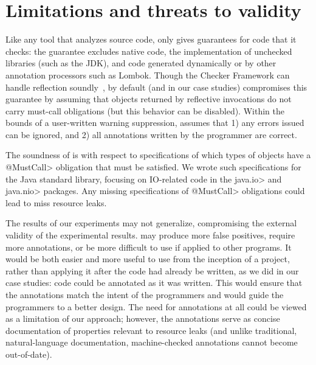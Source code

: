 \section{Limitations and threats to validity}
\label{sec:threats}

Like any tool that analyzes source code, \tool only
gives guarantees for code that it checks: the guarantee
excludes native code, the implementation of unchecked libraries (such as the JDK),
and code generated dynamically or by other annotation processors
such as Lombok.
Though
the Checker Framework can handle 
reflection soundly~\cite{BarrosJMVDdAE2015}, by default (and in our case studies)
\tool compromises this guarantee
by assuming that objects returned by reflective invocations
do not carry must-call obligations (but this behavior can
be disabled).
Within the bounds
of a user-written warning suppression, \tool assumes that 1)
any errors issued can be ignored, and 2) all annotations
written by the programmer are correct.

 The soundness of
\tool is with respect to specifications of which types of objects have a
\<@MustCall> obligation that must be satisfied.  We wrote such specifications
for the Java standard library, focusing on IO-related code in the \<java.io> and
\<java.nio> packages.  Any missing specifications of \<@MustCall> obligations
could lead \tool to miss resource leaks.

The results of our experiments may not generalize, compromising the
external validity of the experimental results.
\Tool may produce more false positives, require
more annotations, or be more difficult to use if applied to other
programs.  It would be both easier and more useful to use \tool from
the inception of a project, rather than applying it after the code had
already be written, as we did in our case studies: code could be
annotated as it was written.  This would ensure that the annotations match
the intent of the programmers and would guide the programmers to a better design.
The need for annotations at all could be viewed as a limitation of our approach;
however, the annotations serve as concise documentation of
properties relevant to resource leaks (and unlike traditional, natural-language
documentation, machine-checked annotations cannot become out-of-date).

